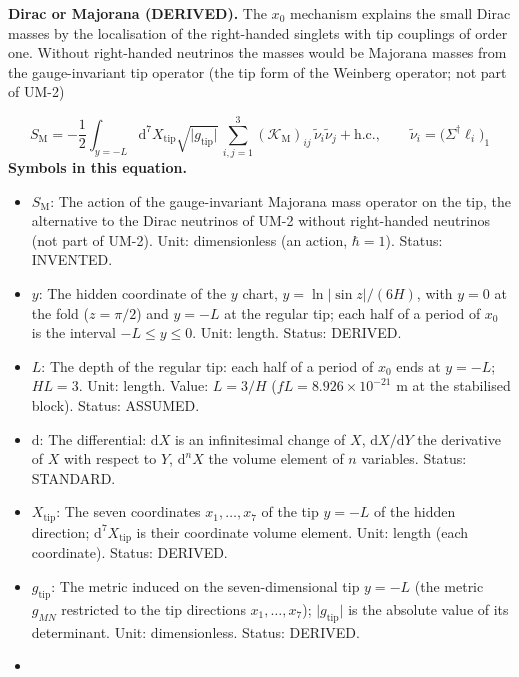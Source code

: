 \documentclass[
  10pt,
]{article}
\providecommand{\tightlist}{%
  \setlength{\itemsep}{0pt}\setlength{\parskip}{0pt}}
\begin{document}
\textbf{Dirac or Majorana (DERIVED).} The \(x_0\) mechanism explains the
small Dirac masses by the localisation of the right-handed singlets with
tip couplings of order one. Without right-handed neutrinos the masses
would be Majorana masses from the gauge-invariant tip operator (the tip
form of the Weinberg operator; not part of UM-2)

\[ S_{\mathrm{M}} = -\frac12\int_{y=-L}\mathrm{d}^7X_{\mathrm{tip}}\sqrt{\lvert g_{\mathrm{tip}}\rvert}\,\sum_{i,j=1}^{3}(\mathcal{K}_{\mathrm{M}})_{ij}\,\tilde\nu_i\tilde\nu_j + \text{h.c.},\qquad \tilde\nu_i = \big(\Sigma^\dagger\ell_i\big)_1 \]
\textbf{Symbols in this equation.}

\begin{itemize}
\tightlist
\item
  \(S_{\mathrm{M}}\): The action of the gauge-invariant Majorana mass
  operator on the tip, the alternative to the Dirac neutrinos of UM-2
  without right-handed neutrinos (not part of UM-2). Unit: dimensionless
  (an action, \(\hbar = 1\)). Status: INVENTED.
\item
  \(y\): The hidden coordinate of the \(y\) chart,
  \(y = \ln\lvert\sin z\rvert/(6H)\), with \(y = 0\) at the fold
  (\(z = \pi/2\)) and \(y = -L\) at the regular tip; each half of a
  period of \(x_0\) is the interval \(-L \le y \le 0\). Unit: length.
  Status: DERIVED.
\item
  \(L\): The depth of the regular tip: each half of a period of \(x_0\)
  ends at \(y = -L\); \(HL = 3\). Unit: length. Value: \(L = 3/H\)
  (\(fL = 8.926\times10^{-21}\) m at the stabilised block). Status:
  ASSUMED.
\item
  \(\mathrm{d}\): The differential: \(\mathrm{d}X\) is an infinitesimal
  change of \(X\), \(\mathrm{d}X/\mathrm{d}Y\) the derivative of \(X\)
  with respect to \(Y\), \(\mathrm{d}^nX\) the volume element of \(n\)
  variables. Status: STANDARD.
\item
  \(X_{\mathrm{tip}}\): The seven coordinates \(x_1, \dots, x_7\) of the
  tip \(y = -L\) of the hidden direction;
  \(\mathrm{d}^7X_{\mathrm{tip}}\) is their coordinate volume element.
  Unit: length (each coordinate). Status: DERIVED.
\item
  \(g_{\mathrm{tip}}\): The metric induced on the seven-dimensional tip
  \(y = -L\) (the metric \(g_{MN}\) restricted to the tip directions
  \(x_1, \dots, x_7\)); \(\lvert g_{\mathrm{tip}}\rvert\) is the
  absolute value of its determinant. Unit: dimensionless. Status:
  DERIVED.
\item

\end{itemize}
\end{document}
